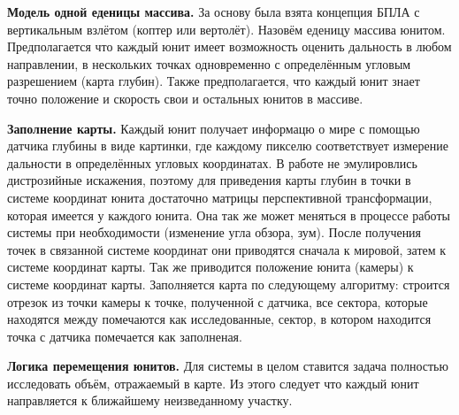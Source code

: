 \begin{slide}

\makeatletter
\let\@topfil\relax
\makeatother

    \textbf{Модель одной еденицы массива.} За основу была взята концепция БПЛА с вертикальным взлётом
    (коптер или вертолёт). Назовём еденицу массива юнитом. Предполагается что каждый юнит имеет возможность
    оценить дальность в любом направлении, в нескольких точках одновременно с определённым 
    угловым разрешением (карта глубин). Также предполагается, что каждый юнит знает точно положение и скорость
    свои и остальных юнитов в массиве.

\end{slide}

\begin{slide}

\makeatletter
\let\@topfil\relax
\makeatother

    \textbf{Заполнение карты.} Каждый юнит получает информацю о мире с помощью датчика глубины в виде картинки,
    где каждому пикселю соответствует измерение дальности в определённых угловых координатах. В работе не эмулировлись
    дистрозийные искажения, поэтому для приведения карты глубин в точки в системе координат юнита достаточно 
    матрицы перспективной трансформации, которая имеется у каждого юнита. Она так же может меняться в процессе работы
    системы при необходимости (изменение угла обзора, зум). После получения точек в связанной системе координат они приводятся
    сначала к мировой, затем к системе координат карты. Так же приводится положение юнита (камеры) к системе координат карты.
    Заполняется карта по следующему алгоритму: строится отрезок из точки камеры к точке, полученной с датчика, все сектора, которые
    находятся между помечаются как исследованные, сектор, в котором находится точка с датчика помечается как заполненая.

\end{slide}

\begin{slide}

\makeatletter
\let\@topfil\relax
\makeatother

    \textbf{Логика перемещения юнитов.} Для системы в целом ставится задача полностью исследовать объём, отражаемый в карте.
    Из этого следует что каждый юнит направляется к ближайшему неизведанному участку.

\end{slide}

